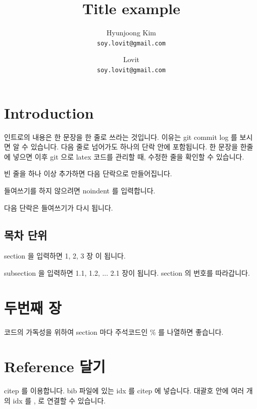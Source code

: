 \documentclass[11pt]{article}
\begin{document}
\title{Title example}
\author{
  Hyunjoong Kim\\
  \texttt{soy.lovit@gmail.com}
  \and
  Lovit\\
  \texttt{soy.lovit@gmail.com}
}

\maketitle
\smallskip

\section{Introduction}

인트로의 내용은 한 문장을 한 줄로 쓰라는 것입니다.
이유는 git commit log 를 보시면 알 수 있습니다.
다음 줄로 넘어가도 하나의 단락 안에 포함됩니다.
한 문장을 한줄에 넣으면 이후 git 으로 latex 코드를 관리할 때, 수정한 줄을 확인할 수 있습니다.

빈 줄을 하나 이상 추가하면 다음 단락으로 만들어집니다.

\noindent
들여쓰기를 하지 않으려면 noindent 를 입력합니다.

다음 단락은 들여쓰기가 다시 됩니다.

\subsection{목차 단위}

section 을 입력하면 1, 2, 3 장 이 됩니다.

subsection 을 입력하면 1.1, 1.2, ... 2.1 장이 됩니다. section 의 번호를 따라갑니다.

\section{두번째 장}

코드의 가독성을 위하여 section 마다 주석코드인 \% 를 나열하면 좋습니다.

\section{Reference 달기}

citep 를 이용합니다. bib 파일에 있는 idx 를 citep 에 넣습니다. \citep{jain2010data} 대괄호 안에 여러 개의 idx 를 , 로 연결할 수 있습니다.
\end{document}
